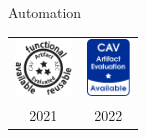 \documentclass[
11pt,
usepdftitle=false,
aspectratio=169,
xcolor={table,usenames,dvipsnames},
]{beamer}
\begin{document}
\begin{frame}[fragile]{Automation}
\begin{center}
\begin{tabular}{c@{\qquad}c}
  \includegraphics[height=1.5cm,width=1.5cm]{aec-badge_f_a_r.pdf}
  &
  \includegraphics[height=1.5cm,width=1.2cm]{1-available.pdf}
  \\
2021 &
2022
\end{tabular}
\end{center}
\end{frame}
\end{document}
